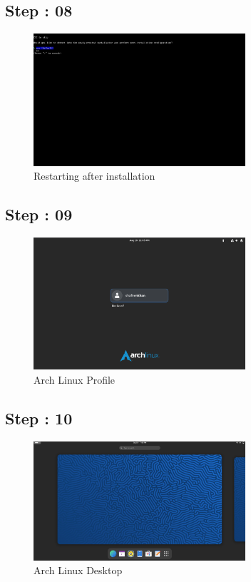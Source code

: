 \documentclass{article}
\begin{document}
\subsection{Step : 08}
\begin{figure}[H]
    \centering
    \includegraphics[width=0.7\textwidth]{8.png}
    \caption{Restarting after installation}
    \label{fig:install_Arch8}
\end{figure}

\subsection{Step : 09}
\begin{figure}[H]
    \centering
    \includegraphics[width=0.7\textwidth]{11.png}
    \caption{Arch Linux Profile}
    \label{fig:install_Arch11}
\end{figure}

\subsection{Step : 10}
\begin{figure}[H]
    \centering
    \includegraphics[width=0.7\textwidth]{14.jpg}
    \caption{Arch Linux Desktop}
    \label{fig:install_Arch14}
\end{figure}
\end{document}
